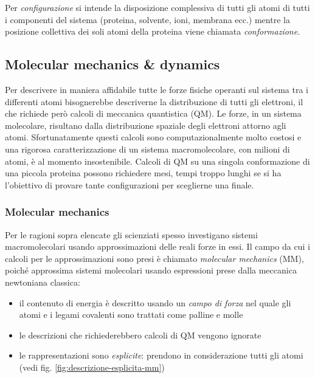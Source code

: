 {Per \textit{configurazione} si intende la disposizione complessiva di tutti gli atomi di tutti i componenti del sistema (proteina, solvente, ioni, membrana ecc.) mentre la posizione collettiva dei soli atomi della proteina viene chiamata \textit{conformazione}.

\subsection{Molecular mechanics \& dynamics}

\par Per descrivere in maniera affidabile tutte le forze fisiche operanti sul sistema tra i differenti atomi bisognerebbe descriverne la distribuzione di tutti gli elettroni, il che richiede però calcoli di meccanica quantistica (QM). Le forze, in un sistema molecolare, risultano dalla distribuzione spaziale degli elettroni attorno agli atomi. Sfortunatamente questi calcoli sono computazionalmente molto costosi e una rigorosa caratterizzazione di un sistema macromolecolare, con milioni di atomi, è al momento insostenibile. Calcoli di QM su una singola conformazione di una piccola proteina possono richiedere mesi, tempi troppo lunghi se si ha l'obiettivo di provare tante configurazioni per sceglierne una finale. 

\subsubsection{Molecular mechanics}

\par Per le ragioni sopra elencate gli scienziati spesso investigano sistemi macromolecolari usando approssimazioni delle reali forze in essi. Il campo da cui i calcoli per le approssimazioni sono presi è chiamato \textit{molecular mechanics} (MM), poiché approssima sistemi molecolari usando espressioni prese dalla meccanica newtoniana classica:
\begin{itemize}
	\item il contenuto di energia è descritto usando un \textit{campo di forza} nel quale gli atomi e i legami covalenti sono trattati come palline e molle
	\item le descrizioni che richiederebbero calcoli di QM vengono ignorate
	\item le rappresentazioni sono \textit{esplicite}: prendono in considerazione tutti gli atomi (vedi fig. \ref{fig:descrizione-esplicita-mm})
\end{itemize}

}
